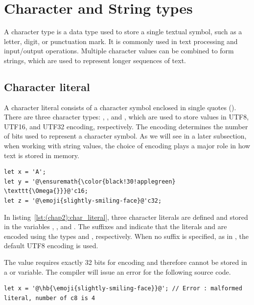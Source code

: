 \vfill\pagebreak
\section{Character and String types}

A character type is a data type used to store a single textual symbol, such as a
letter, digit, or punctuation mark. It is commonly used in text processing and
input/output operations. Multiple character values can be combined to form
strings, which are used to represent longer sequences of text.

\subsection{Character literal}
\label{sec:chap2_char_lit}

A character literal consists of a character symbol enclosed in single quotes
(). There are three character types: , , and
, which are used to store values in UTF8, UTF16, and UTF32
encoding, respectively. The encoding determines the number of bits used to
represent a character symbol. As we will see in a later subsection, when working
with string values, the choice of encoding plays a major role in how text is
stored in memory.

\begin{lstlisting}[style=coloredverbatim, label=lst:(chap2):char_literal, caption=Example of character literals, escapechar=@]
let x = 'A';
let y = '@\ensuremath{\color{black!30!applegreen} \texttt{\Omega{}}}@'c16;
let z = '@\emoji{slightly-smiling-face}@'c32;
\end{lstlisting}


In listing~\ref{lst:(chap2):char_literal}, three character literals are defined
and stored in the variables , , and . The suffixes
 and  indicate that the literals  and
 are encoded using the types  and ,
respectively. When no suffix is specified, as in , the default UTF8
encoding is used.

The value  requires exactly 32 bits for encoding and
therefore cannot be stored in a  or  variable. The compiler
will issue an error for the following source code.

\begin{lstlisting}[style=coloredverbatimError, label=lst:(chap2):char_encode_error, escapechar=@]
let x = '@\hb{\emoji{slightly-smiling-face}}@'; // Error : malformed literal, number of c8 is 4 
\end{lstlisting}%

